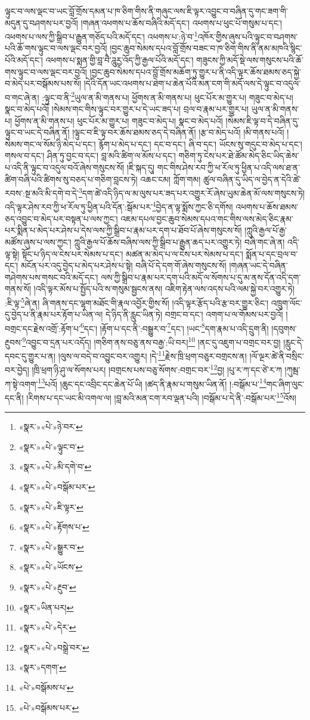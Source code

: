 ལྟུང་བ་ལས་ལྡང་བ་ཡང་བློ་གྲོས་དམན་པ་ཁ་ཅིག་གིས་ནི་གཞུང་ལས་ཇི་ལྟར་འབྱུང་བ་བཞིན་དུ་གང་ཟག་གི་མདུན་དུ་བཤགས་པར་བྱའོ། །གཞན་འཕགས་པ་ཆོས་བཞིའི་མདོ་དང་། འཕགས་པ་ཕུང་པོ་གསུམ་པ་དང་། འཕགས་པ་ལས་ཀྱི་སྒྲིབ་པ་རྒྱུན་གཅོད་པའི་མདོ་དང་། འཕགས་པ་:ཉེ་བ་\footnote{«སྣར་»«པེ་»ཉེ་བར་}འཁོར་གྱིས་ཞུས་པའི་ལྟུང་བ་བཤགས་པའི་ཆོ་གས་ལྟུང་བ་ལས་ལྡང་བར་བྱའོ། །བྱང་ཆུབ་སེམས་དཔའ་བློ་གྲོས་བཟང་བ་ཁ་ཅིག་གིས་ནི་ནམ་མཁའི་སྙིང་པོའི་མདོ་དང་། འཕགས་པ་སྨན་གྱི་བླ་བཻ་ཌཱུརྱ་འོད་ཀྱི་རྒྱལ་པོའི་མདོ་དང་། གཟུངས་ཀྱི་མདོ་སྡེ་ལས་གསུངས་པའི་ཆོ་གས་ལྟུང་བ་ལས་ལྡང་བར་བྱའོ། །བྱང་ཆུབ་སེམས་དཔའ་བློ་གྲོས་མཆོག་ཏུ་གྱུར་པ་ནི་འདི་ལྟར་ཆོས་ཐམས་ཅད་སྐྱེ་བ་མེད་པར་བསྒོམས་པས་སོ། །དེའི་དོན་ཡང་འཕགས་པ་ཐེག་པ་ཆེན་པོའི་མན་ངག་གི་མདོ་ལས་དེ་ལྟུང་བ་འདུལ་བ་གང་ཞེ་ན། :ལྟུང་བ་ནི་\footnote{«སྣར་»«པེ་»ལྟུང་བ་}ཡུལ་ན་མི་གནས་པ། ཕྱོགས་ན་མི་གནས་པ། ཕུང་པོར་མ་གྱུར་པ། གཟུང་བ་མེད་པ། སྣང་བ་མེད་པའོ། །སེམས་གང་གིས་ལྟུང་བར་གྱུར་པ་དེ་ཡང་ཟད་པ། བྲལ་བ་རྣམ་པར་གྱུར་པ། ཡུལ་ན་མི་གནས་པ། ཕྱོགས་ན་མི་གནས་པ། ཕུང་པོར་མ་གྱུར་པ། གཟུང་བ་མེད་པ། སྣང་བ་མེད་པའོ། །སེམས་ཇི་ལྟ་བ་དེ་བཞིན་དུ་ལྟུང་བ་ཡང་དེ་བཞིན་ནོ། །ལྟུང་བ་ཇི་ལྟ་བར་ཆོས་ཐམས་ཅད་དེ་བཞིན་ནོ། །རྩ་བ་མེད་པའོ། །མི་གནས་པའོ། །སེམས་གང་ལ་སོམ་ཉི་མེད་པ་དང་། རྙོག་པ་མེད་པ་དང་། དང་བ་དང་། ཞི་བ་དང་། ཡོངས་སུ་གདུང་བ་མེད་པ་དང་། གསལ་བ་དང་། ཤིན་ཏུ་བྱང་བ་དང་། བླ་མའི་ཚིག་ལ་མོས་པ་དང་། གཅིག་ཏུ་ངེས་པར་ཐེ་ཚོམ་མེད་ཅིང་ཡིད་ཆེས་པ་འདི་ནི་ལྟུང་བ་འདུལ་བའོ་ཞེས་གསུངས་སོ། །ཇི་སྐད་དུ། གང་གིས་ཤེས་རབ་ཀྱི་ཕ་རོལ་ཏུ་ཕྱིན་པ་འདི་ལས་ཐ་ན་ཚིག་བཞི་པའི་ཚིགས་སུ་བཅད་པ་གཅིག་བླངས་ཏེ། འཆང་ངམ། ཀློག་གམ། ཚུལ་བཞིན་དུ་ཡིད་ལ་བྱེད་ན་དེའི་ཚེ་རབས་:སྔ་མའི་མི་དགེ་བ་དེ་\footnote{«སྣར་»«པེ་»མི་དགེ་བ་}དག་ཚེ་འདི་ཉིད་ལ་མ་ལུས་པར་ཟད་པར་འགྱུར་རོ་ཞེས་ཡུམ་ཆེན་མོ་ལས་གསུངས་ཏེ། འདི་ལྟར་ཤེས་རབ་ཀྱི་ཕ་རོལ་ཏུ་ཕྱིན་པའི་དོན་:སྒོམ་པར་\footnote{«སྣར་»«པེ་»བསྒོམ་པར་}བྱེད་ན་ལྟ་སྨོས་ཀྱང་ཅི་དགོས། འཕགས་པ་ཆོས་ཐམས་ཅད་འབྱུང་བ་མེད་པར་བསྟན་པ་ལས་ཀྱང་། འཇམ་དཔལ་བྱང་ཆུབ་སེམས་དཔའ་གང་གིས་ལས་མེད་ཅིང་རྣམ་པར་སྨིན་པ་མེད་པར་ཤེས་པ་དེས་ལས་ཀྱི་སྒྲིབ་པ་རྣམ་པར་དག་པ་ཐོབ་པོ་ཞེས་གསུངས་སོ། །ཀླུའི་རྒྱལ་པོ་རྒྱ་མཚོས་ཞུས་པ་ལས་ཀྱང་། ཀླུའི་རྒྱལ་པོ་ཆོས་བཞིས་ལས་ཀྱི་སྒྲིབ་པ་རྒྱུན་ཆད་པར་འགྱུར་ཏེ། བཞི་གང་ཞེ་ན། འདི་ལྟ་སྟེ། སྟོང་པ་ཉིད་ལ་ངེས་པར་སེམས་པ་དང་། མཚན་མ་མེད་པ་ལ་ངེས་པར་སེམས་པ་དང་། སྨོན་པ་དང་བྲལ་བ་དང་། མངོན་པར་འདུ་བྱེད་པ་མེད་པར་ཤེས་པ་སྟེ། བཞི་པོ་དེ་དག་གོ་ཞེས་གསུངས་སོ། །གཞན་ཡང་དེ་བཞིན་གཤེགས་པས་གསང་བའི་མདོ་དང་། ལས་ཀྱི་སྒྲིབ་པ་རྣམ་པར་དག་པའི་མདོ་ལ་སོགས་པ་དུ་མ་ནས་དོན་འདི་དག་གནས་སོ། །འདི་ལྟར་མོས་པ་སྤྱོད་པའི་ས་གསུམ་སྦྱངས་ནས། འཇིག་རྟེན་ལས་འདས་པའི་ལམ་སྐྱེ་བར་འགྱུར་ཏེ། :ཇི་ལྟ་\footnote{«སྣར་»«པེ་»ཇི་ལྟར་}ཞེ་ན། ཞི་གནས་དང་ལྷག་མཐོང་གི་རྣལ་འབྱོར་གྱིས་སོ། །འདི་ལྟར་རྩོད་པའི་རྩ་བར་གྱུར་ཅིང་། འཁྲུག་ལོང་དུ་བྱེད་པ་ནི་རྣམ་པར་རྟོག་པ་ཡིན་ལ། དེ་ཉིད་ནི་རླུང་ཡིན་ཏེ། བགྲང་བ་དང་། འགག་པ་ལ་གོམས་པར་བྱའོ། །བགྲང་དང་རྗེས་འགྲོ་:རྟོག་པ་\footnote{«སྣར་»«པེ་»རྟོགས་པ་}དང་། །རྟོག་པ་དང་ནི་:བསྒྱུར་བ་\footnote{«སྣར་»«པེ་»སྒྱུར་བ་}དང་། །ཡང་\footnote{«སྣར་»«པེ་»ཡོངས་}དག་རྣམ་པ་འདི་དྲུག་ནི། །དབུགས་རྔུབས་\footnote{«སྣར་»«པེ་»རྔུབ་}འབྱུང་བ་དྲན་པར་འདོད། །གཅིག་ནས་བཅུ་ནས་བརྒྱ་:ཡི་བར།\footnote{«སྣར་»ཡིན་པར།} །ནང་དུ་འཇུག་པ་བགྲང་བར་བྱ། །རླུང་དེ་དབང་དུ་གྱུར་པ་ན། །ལུས་ལ་བདེ་བ་འབྱུང་བར་འགྱུར། །དེ་\footnote{«སྣར་»«པེ་»དེར་}རྗེས་ཁྲི་ཕྲག་བཅུར་བགྲངས་ན། །ལོ་ལྔར་ཚེ་ནི་བསྲིང་བར་བྱེད། །ཁྲི་ཕྲག་ཉི་ཤུ་ལ་སོགས་པར། །བགྲངས་པས་བཅུ་སོགས་:བགྲང་བར་\footnote{«སྣར་»«པེ་»བསྒྲེ་བར་}བྱ། །པུ་ར་ཀ་དང་ཙེ་ར་ཀ །ཀུམྦ་ཀ་སྟེ་འགག་\footnote{«སྣར་»དགག་}པའོ། །ཆུང་དང་འབྲིང་དང་ཆེན་པོ་ཡི། །ཚད་ནི་རྣམ་པ་གསུམ་ཡིན་ནོ། །:བསྒོམ་པ་\footnote{«པེ་»བསྒོམས་པ་}གང་ཞིག་ལུང་དང་ནི། །རིགས་པ་དང་ཡང་མི་འགལ་ལ། །བླ་མའི་མན་ངག་རབ་ལྡན་པའི། །བསྒོམ་པ་དེ་ནི་:བསྒོམ་པར་\footnote{«པེ་»བསྒོམས་པར་}འོས། 